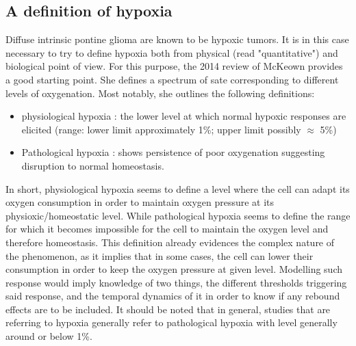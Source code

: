 \documentclass[11pt,a4paper]{article}
\begin{document}
\subsection{A definition of hypoxia}
Diffuse intrinsic pontine glioma are known to be hypoxic tumors.\cite{Bailleul2021} It is in this case necessary to try to define hypoxia both from physical (read "quantitative") and biological point of view. For this purpose, the 2014 review of McKeown provides a good starting point.\cite{McKeown2014} She defines a spectrum of sate corresponding to different levels of oxygenation. Most notably, she outlines the following definitions: 
\begin{itemize}
\item physiological hypoxia : the lower level at which normal hypoxic responses are elicited (range: lower limit approximately 1\%; upper limit possibly $\approx$ 5\%)
\item Pathological hypoxia : shows persistence of poor oxygenation suggesting disruption to normal homeostasis.
\end{itemize} 
In short, physiological hypoxia seems to define a level where the cell can adapt its oxygen consumption in order to maintain oxygen pressure at its physioxic/homeostatic level. While pathological hypoxia seems to define the range for which it becomes impossible for the cell to maintain the oxygen level and therefore homeostasis. This definition already evidences the complex nature of the phenomenon, as it implies that in some cases, the cell can lower their consumption in order to keep the oxygen pressure at given level. Modelling such response would imply knowledge of two things, the different thresholds triggering said response, and the temporal dynamics of it in order to know if any rebound effects are to be included. It should be noted that in general, studies that are referring to hypoxia generally refer to pathological hypoxia with level generally around or below 1\%. \cite{Bailleul2021}\cite{Waker2018}\cite{Saxena2019}
\end{document}
